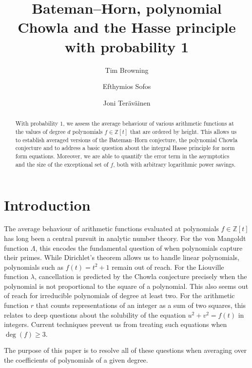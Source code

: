 \documentclass[11pt,letterpaper]{amsart}
\title[Bateman--Horn,  polynomial Chowla and the Hasse principle]{Bateman--Horn,  polynomial Chowla and the Hasse principle with probability 1}
\author{Tim Browning}
\author{Efthymios Sofos}
\author{Joni Ter\"av\"ainen}
\renewcommand{\geq}{\geqslant}
\theoremstyle{definition}
\numberwithin{equation}{section}
\newcommand{\0}{\mathbf{0}}
\begin{document}
\begin{abstract}
With probability $1$, 
we assess the average behaviour of various arithmetic functions at the values of degree $d$ polynomials $f\in \mathbb{Z}[t]$ that are ordered by  height.  This allows us to establish averaged versions of the
Bateman--Horn conjecture, the polynomial Chowla conjecture and to address a basic question
about the integral Hasse principle for norm form equations.
Moreover, we are able to  quantify the error term in the asymptotics and the size of the exceptional set of $f$, both with arbitrary logarithmic power savings.  
\end{abstract}


\maketitle



\thispagestyle{empty}
\setcounter{tocdepth}{1}
\tableofcontents






\section{Introduction}




The average behaviour of arithmetic functions evaluated at polynomials $f\in \mathbb{Z}[t]$ has long been a central pursuit in analytic number theory.  For the 
von Mangoldt function $\Lambda$, this encodes the fundamental question of when  polynomials capture their primes.  While Dirichlet's theorem allows us to handle linear polynomials, 
polynomials such as 
$f(t)=t^2+1$  remain out of reach. 
 For the Liouville function
 $\lambda$, cancellation is predicted by the  Chowla conjecture precisely when the polynomial is not proportional to the square of a polynomial. This also seems out of reach for irreducible 
 polynomials of degree at least two.
 For the arithmetic function $r$ that counts representations of an integer as a sum of two squares,
 this relates to deep questions about the solubility of 
  the equation
 $
 u^2+v^2=f(t)
 $
 in integers.
 Current techniques prevent us from treating such equations when $\deg(f)\geq 3$.

 The purpose of this paper is 
to resolve all of these questions when averaging over  the coefficients of  polynomials of a given  degree. 
\end{document}
